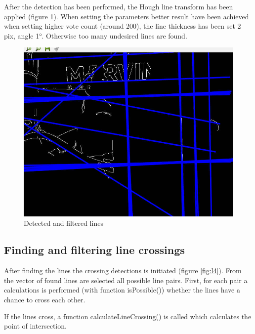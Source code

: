 After the detection has been performed, the Hough line transform has been applied (figure \ref{fig:linesHough}). When setting the parameters better result have been achieved when setting higher vote count (around 200), the line thickness has been set 2 pix, angle 1°. Otherwise too many undesired lines are found.

\begin{figure}[ht!]
	\centering
	\includegraphics[width=\textwidth]{figures/lines3}
	\caption{Detected and filtered lines }
	\label{fig:linesHough}
\end{figure}

\subsection{Finding and filtering line crossings}
After finding the lines the crossing detections is initiated (figure \ref{fig:l4}). From the vector of found lines are selected all possible line pairs. First, for each pair a calculations is performed (with function isPossible()) whether the lines have a chance to cross each other.

If the lines cross, a function calculateLineCrossing() is called which calculates the point of intersection. 

